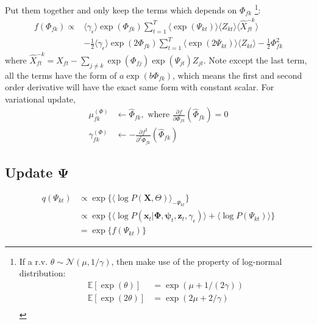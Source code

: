 \documentclass[11pt]{article} %
\begin{document}
Put them together and only keep the terms which depends on $\Phi_{fk}$ \footnote{If a r.v. $\theta \sim \mathcal{N}(\mu, 1/\gamma)$, then make use of the property of log-normal distribution:
\begin{align*}
\mathbb{E}[\exp(\theta)]  &= \exp(\mu + 1/(2\gamma))\\
\mathbb{E}[\exp(2\theta)] &= \exp(2\mu + 2/\gamma)\\
\end{align*}
}:
\begin{align*}
f(\Phi_{fk}) \propto & \langle \gamma_{\epsilon} \rangle \exp(\Phi_{fk}) \sum_{t=1}^T \langle \exp(\Psi_{kt}) \rangle \langle Z_{kt} \rangle
\langle \hat{X}_{ft}^{-k} \rangle \\
& -\frac{1}{2}  \langle \gamma_{\epsilon} \rangle \exp(2\Phi_{fk}) \sum_{t=1}^T \langle \exp(2\Psi_{kt}) \rangle \langle Z_{kt} \rangle - \frac{1}{2}\Phi_{fk}^2
\end{align*}
where $\hat{X}_{ft}^{-k}  = X_{ft} - \sum_{j\neq k}  \exp(\Phi_{fj}) \exp(\Psi_{jt}) Z_{jt}$. Note except the last term, all the terms have the form of $a\exp(b \Phi_{fk})$, which means the first and second order derivative will have the exact same form with constant scalar. For variational update,
\begin{align*}
\mu_{fk}^{(\Phi)} &\leftarrow \hat{\Phi}_{fk}, \text{ where }  \frac{\partial f}{\partial \Phi_{fk}} (\hat{\Phi}_{fk}) = 0 \\
\gamma_{fk}^{(\Phi)} &\leftarrow -\frac{\partial f^2}{\partial^2 \Phi_{fk}} (\hat{\Phi}_{fk})
\end{align*}

\subsection{Update $\mathbf{\Psi}$}
\begin{align*}
q(\Psi_{kt}) &\propto \exp\{\langle\log P(\mathbf{X}, \Theta)\rangle_{-\Psi_{kt}}\}\\
&\propto \exp\{\langle \log P(\bm{x}_t | \mathbf{\Phi}, \bm{\psi}_t, \mathbf{z}_t, \gamma_\epsilon)\rangle + \langle \log P(\Psi_{kt}) \rangle\}\\
&= \exp\{f(\Psi_{kt})\}
\end{align*}
\end{document}
